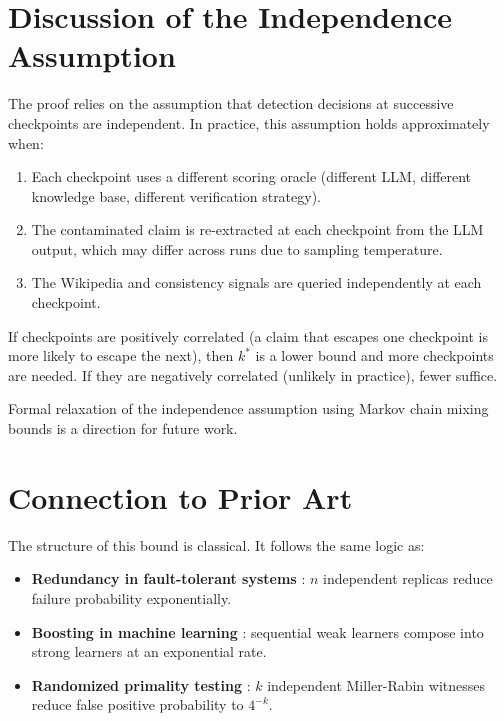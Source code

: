 \documentclass[12pt,a4paper]{article}
\begin{document}
\section{Discussion of the Independence Assumption}

The proof relies on the assumption that detection decisions at successive checkpoints are independent. In practice, this assumption holds approximately when:

\begin{enumerate}
    \item Each checkpoint uses a different scoring oracle (different LLM, different knowledge base, different verification strategy).
    \item The contaminated claim is re-extracted at each checkpoint from the LLM output, which may differ across runs due to sampling temperature.
    \item The Wikipedia and consistency signals are queried independently at each checkpoint.
\end{enumerate}

If checkpoints are positively correlated (a claim that escapes one checkpoint is more likely to escape the next), then $k^*$ is a lower bound and more checkpoints are needed. If they are negatively correlated (unlikely in practice), fewer suffice.

Formal relaxation of the independence assumption using Markov chain mixing bounds is a direction for future work.

\section{Connection to Prior Art}

The structure of this bound is classical. It follows the same logic as:

\begin{itemize}
    \item \textbf{Redundancy in fault-tolerant systems} \citep{avizienis2004basic}: $n$ independent replicas reduce failure probability exponentially.
    \item \textbf{Boosting in machine learning} \citep{schapire1990strength}: sequential weak learners compose into strong learners at an exponential rate.
    \item \textbf{Randomized primality testing} \citep{rabin1980probabilistic}: $k$ independent Miller-Rabin witnesses reduce false positive probability to $4^{-k}$.
\end{itemize}
\end{document}
